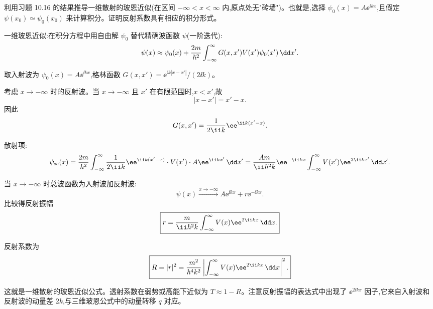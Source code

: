 \begin{question}
利用习题 10.16 的结果推导一维散射的玻恩近似(在区间 $-\infty<x<\infty$ 内,原点处无"砖墙")。也就是,选择 $\psi_0(x)=A\ee^{\ii kx}$,且假定 $\psi(x_0)\simeq\psi_0(x_0)$ 来计算积分。证明反射系数具有相应的积分形式。
\begin{solution}
一维玻恩近似:在积分方程中用自由解 $\psi_0$ 替代精确波函数 $\psi$(一阶迭代):
\[
\psi(x)\approx\psi_0(x)+{2m\over\hbar^2}\int_{-\infty}^{\infty}G(x,x')V(x')\psi_0(x')\,\dd x'.
\]

取入射波为 $\psi_0(x)=A\ee^{\ii kx}$,格林函数 $G(x,x')=\ee^{\ii k|x-x'|}/(2\ii k)$。

考虑 $x\to-\infty$ 时的反射波。当 $x\to-\infty$ 且 $x'$ 在有限范围时,$x<x'$,故
\[
|x-x'|=x'-x.
\]
因此
\[
G(x,x')={1\over2\ii k}\ee^{\ii k(x'-x)}.
\]

散射项:
\[
\psi_{\text{sc}}(x)={2m\over\hbar^2}\int_{-\infty}^{\infty}{1\over2\ii k}\ee^{\ii k(x'-x)}\cdot V(x')\cdot A\ee^{\ii kx'}\,\dd x'
={Am\over\ii\hbar^2k}\ee^{-\ii kx}\int_{-\infty}^{\infty}V(x')\ee^{2\ii kx'}\,\dd x'.
\]

当 $x\to-\infty$ 时总波函数为入射波加反射波:
\[
\psi(x)\xrightarrow{x\to-\infty} A\ee^{\ii kx}+r\ee^{-\ii kx}.
\]
比较得反射振幅
\[
\boxed{r={m\over\ii\hbar^2k}\int_{-\infty}^{\infty}V(x)\ee^{2\ii kx}\,\dd x.}
\]

反射系数为
\[
\boxed{R=|r|^2={m^2\over\hbar^4k^2}\left|\int_{-\infty}^{\infty}V(x)\ee^{2\ii kx}\,\dd x\right|^2.}
\]

这就是一维散射的玻恩近似公式。透射系数在弱势或高能下近似为 $T\approx 1-R$。注意反射振幅的表达式中出现了 $\ee^{2\ii kx}$ 因子,它来自入射波和反射波的动量差 $2k$,与三维玻恩公式中的动量转移 $q$ 对应。
\end{solution}
\end{question}

